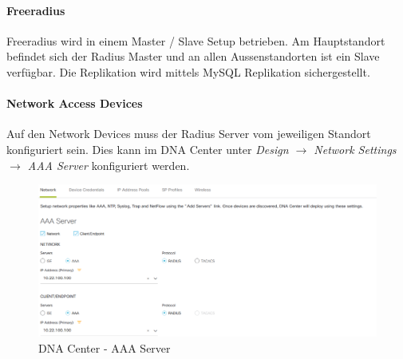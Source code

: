 \paragraph{Freeradius}

Freeradius wird in einem Master / Slave Setup betrieben. Am Hauptstandort befindet sich der Radius Master und an allen Aussenstandorten ist ein Slave verfügbar. Die Replikation wird mittels MySQL Replikation sichergestellt.

\paragraph{Network Access Devices}

Auf den Network Devices muss der Radius Server vom jeweiligen Standort konfiguriert sein. Dies kann im DNA Center unter \textit{Design $\rightarrow$ Network Settings $\rightarrow$ AAA Server} konfiguriert werden.

\begin{figure}[H]
	\centering
	\includegraphics[width=0.8\linewidth]{img/Absicherung/DNA_Center_AAA-Server.png}
	\caption{DNA Center - AAA Server }
	\label{fig:DNA Center - AAA Server}
\end{figure}


